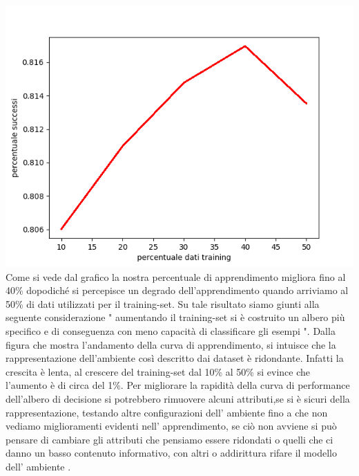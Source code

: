 		\includegraphics[scale=0.86]{performance.png}
		Come si vede dal grafico la nostra percentuale di apprendimento migliora fino al 40\% dopodiché si percepisce un degrado dell'apprendimento quando arriviamo al 50\% di dati utilizzati per il training-set.
		\newline
		 Su tale risultato siamo giunti alla seguente considerazione " aumentando il training-set si è costruito un albero più specifico e di conseguenza  con meno capacità di classificare gli esempi ".
		 Dalla figura che mostra l'andamento della curva di apprendimento, si intuisce che la rappresentazione dell'ambiente così descritto dai dataset è ridondante.
		  Infatti la crescita è lenta, al crescere del training-set dal 10\% al 50\% si evince che l'aumento è di circa del 1\%.
		  Per migliorare la rapidità della curva di performance dell'albero di decisione si potrebbero rimuovere alcuni attributi,se si è sicuri della rappresentazione, testando altre configurazioni dell' ambiente fino a che non vediamo miglioramenti evidenti nell' apprendimento, se ciò non avviene si può pensare di cambiare gli attributi che pensiamo essere ridondati o quelli che ci danno un basso contenuto informativo, con altri o addirittura rifare il modello dell' ambiente . 
		\subsection{}
		
